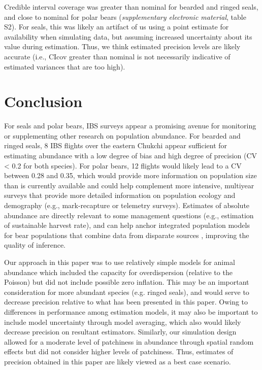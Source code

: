 \documentclass[]{rsos}%
\begin{document}
{Credible interval coverage was greater than nominal for bearded and ringed seals, and close to nominal for polar bears (\textit{supplementary electronic material}, table S2).  For seals, this was likely an artifact of us using a point estimate for availability when simulating data, but assuming increased uncertainty about its value during estimation.  Thus, we think estimated precision levels are likely accurate (i.e., CIcov greater than nominal is not necessarily indicative of estimated variances that are too high).



\section{Conclusion}

For seals and polar bears, IBS surveys appear a promising avenue for monitoring or supplementing other research on population abundance.  For bearded and ringed seals, 8 IBS flights over the eastern Chukchi appear sufficient for estimating abundance with a low degree of bias and high degree of precision (CV < 0.2 for both species).  For polar bears, 12 flights would likely lead to a CV between 0.28 and 0.35, which would provide more information on population size than is currently available and could help complement more intensive, multiyear surveys that provide more detailed information on population ecology and demography (e.g., mark-recapture or telemetry surveys).  Estimates of absolute abundance are directly relevant to some management questions (e.g., estimation of sustainable harvest rate), and can help anchor integrated population models for bear populations that combine data from disparate sources \cite{FiebergEtAl2010}, improving the quality of inference.

Our approach in this paper was to use relatively simple models for animal abundance which included the capacity for overdispersion (relative to the Poisson) but did not include possible zero inflation.  This may be an important consideration for more abundant species (e.g. ringed seals), and would serve to decrease precision relative to what has been presented in this paper.  Owing to differences in performance among estimation models, it may also be important to include model uncertainty through model averaging, which also would likely decrease precision on resultant estimators. Similarly, our simulation design allowed for a moderate level of patchiness in abundance through spatial random effects but did not consider higher levels of patchiness. Thus, estimates of precision obtained in this paper are likely viewed as a best case scenario.

}
\end{document}
